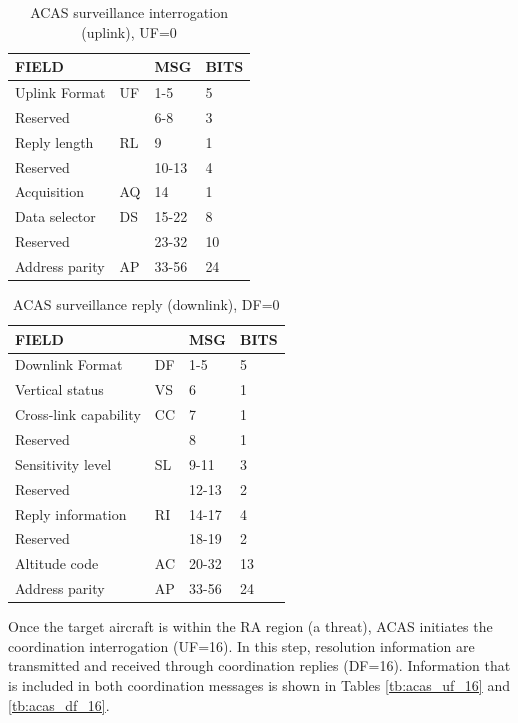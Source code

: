 \begin{table}[ht]
  \centering
  \caption{ACAS surveillance interrogation (uplink), UF=0}
  \label{tb:acas_uf_0}
  \begin{tabular}[t]{|l|l|l|l|}
  \hline
  \textbf{FIELD} & \textbf{} & \textbf{MSG} & \textbf{BITS} \\ \hline
  Uplink Format & UF & 1-5 & 5 \\ \hline
  Reserved &  & 6-8 & 3 \\ \hline
  Reply length & RL & 9 & 1 \\ \hline
  Reserved &  & 10-13 & 4 \\ \hline
  Acquisition & AQ & 14 & 1 \\ \hline
  Data selector & DS & 15-22 & 8 \\ \hline
  Reserved &  & 23-32 & 10 \\ \hline
  Address parity & AP & 33-56 & 24 \\ \hline
  \end{tabular}
\end{table}


\begin{table}[ht]
  \centering
  \caption{ACAS surveillance reply (downlink), DF=0}
  \label{tb:acas_df_0}
  \begin{tabular}[t]{|l|l|l|l|}
  \hline
  \textbf{FIELD} & \textbf{} & \textbf{MSG} & \textbf{BITS} \\ \hline
  Downlink Format & DF & 1-5 & 5 \\ \hline
  Vertical status & VS & 6 & 1 \\ \hline
  Cross-link capability & CC & 7 & 1 \\ \hline
  Reserved &  & 8 & 1 \\ \hline
  Sensitivity level & SL & 9-11 & 3 \\ \hline
  Reserved &  & 12-13 & 2 \\ \hline
  Reply information & RI & 14-17 & 4 \\ \hline
  Reserved &  & 18-19 & 2 \\ \hline
  Altitude code & AC & 20-32 & 13 \\ \hline
  Address parity & AP & 33-56 & 24 \\ \hline
  \end{tabular}
\end{table}


Once the target aircraft is within the RA region (a threat), ACAS initiates the coordination interrogation (UF=16). In this step, resolution information are transmitted and received through coordination replies (DF=16). Information that is included in both coordination messages is shown in Tables \ref{tb:acas_uf_16} and \ref{tb:acas_df_16}.


